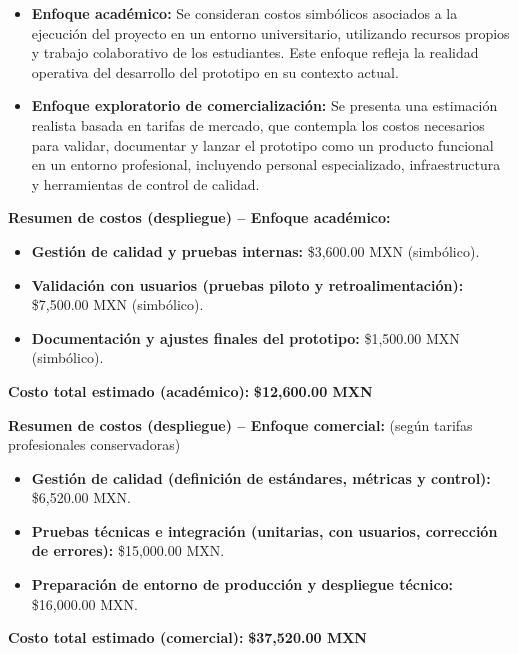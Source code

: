\begin{itemize}
	\item \textbf{Enfoque académico:} Se consideran costos simbólicos asociados a la ejecución del proyecto en un entorno universitario, utilizando recursos propios y trabajo colaborativo de los estudiantes. Este enfoque refleja la realidad operativa del desarrollo del prototipo en su contexto actual.
	
	\item \textbf{Enfoque exploratorio de comercialización:} Se presenta una estimación realista basada en tarifas de mercado, que contempla los costos necesarios para validar, documentar y lanzar el prototipo como un producto funcional en un entorno profesional, incluyendo personal especializado, infraestructura y herramientas de control de calidad.
\end{itemize}

\vspace{1em}
\noindent\textbf{Resumen de costos (despliegue) – Enfoque académico:}
\begin{itemize}
	\item \textbf{Gestión de calidad y pruebas internas:} \$3,600.00 MXN (simbólico).
	\item \textbf{Validación con usuarios (pruebas piloto y retroalimentación):} \$7,500.00 MXN (simbólico).
	\item \textbf{Documentación y ajustes finales del prototipo:} \$1,500.00 MXN (simbólico).
\end{itemize}

\noindent\textbf{Costo total estimado (académico):} \textbf{\$12,600.00 MXN}

\vspace{1em}
\noindent\textbf{Resumen de costos (despliegue) – Enfoque comercial:} (según tarifas profesionales conservadoras)

\begin{itemize}
	\item \textbf{Gestión de calidad (definición de estándares, métricas y control):} \$6,520.00 MXN.
	\item \textbf{Pruebas técnicas e integración (unitarias, con usuarios, corrección de errores):} \$15,000.00 MXN.
	\item \textbf{Preparación de entorno de producción y despliegue técnico:} \$16,000.00 MXN.
\end{itemize}

\noindent\textbf{Costo total estimado (comercial):} \textbf{\$37,520.00 MXN}

